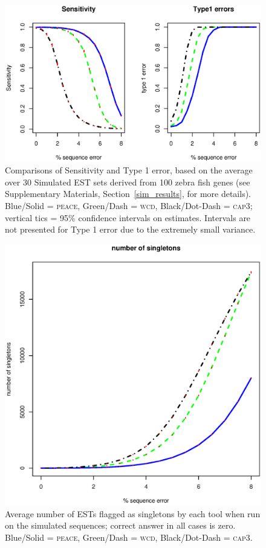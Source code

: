 \documentclass{bioinfo}
\begin{document}
\begin{figure}[b]
\centerline{
\includegraphics[scale=0.5]{SeT1.eps} 
}
\label{SeT1}
\caption{Comparisons of Sensitivity and Type 1 error, based on the
  average over 30 Simulated EST sets derived from 100 zebra fish genes
  (see Supplementary Materials, Section~\ref{sim_results}, for more
  details).   Blue/Solid = \textsc{peace}, Green/Dash =
  \textsc{wcd}, Black/Dot-Dash = \textsc{cap3}; vertical tics = 95\% confidence
  intervals on estimates.  Intervals are not presented for Type 1
  error due to the extremely small variance.}
\end{figure}

\begin{figure}[b]
\centerline{
\includegraphics[scale=0.35]{singletons.eps}
}
\label{singletons}
\caption{Average number of ESTs flagged as singletons by each tool
  when run on the simulated sequences; correct answer in all cases is
  zero.  Blue/Solid = \textsc{peace}, Green/Dash = \textsc{wcd},
  Black/Dot-Dash = \textsc{cap3}.}
\end{figure}
\end{document}
